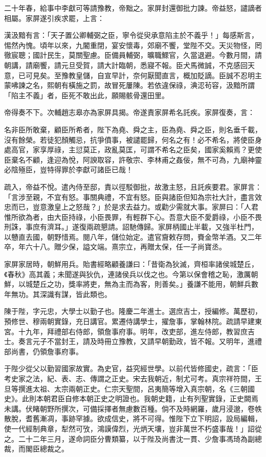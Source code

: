 \begin{pinyinscope}
二十年春，給事中李獻可等請豫教，帝黜之。家屏封還御批力諫。帝益怒，譴謫者相屬。家屏遂引疾求罷，上言：

漢汲黯有言：「天子置公卿輔弼之臣，寧令從臾承意陷主於不義乎！」每感斯言，惕然內愧。頃年以來，九閽重閉，宴安懷毒，郊廟不饗，堂陛不交。天災物怪，罔徹宸聰；國計民生，莫關聖慮。臣備員輔弼，曠職鰥官，久當退避。今數月間，請朝講，請廟饗，請元旦受賀，請大計臨朝，悉寢不報。臣犬馬微誠，不克感回天意，已可見矣。至豫教皇儲，自宣早計，奈何厭聞直言，概加貶謫。臣誠不忍明主蒙咈諫之名，熙朝有橫施之罰，故冒死屢陳。若依違保祿，淟涊茍容，汲黯所謂「陷主不義」者，臣死不敢出此，願賜骸骨還田里。

帝得奏不下。次輔趙志皋亦為家屏具揭。帝遂責家屏希名託疾。家屏復奏，言：

名非臣所敢棄，顧臣所希者，陛下為堯、舜之主，臣為堯、舜之臣，則名垂千載，沒有餘榮。若徒犯顏觸忌，抗爭僨事，被譴罷歸，何名之有！必不希名，將使臣身處高官，家享厚祿，主愆莫正，政亂莫匡，可謂不希名之臣矣，國家奚賴焉？更使臣棄名不顧，逢迎為悅，阿諛取容，許敬宗、李林甫之姦佞，無不可為，九廟神靈必陰殛臣，豈特得罪於李獻可諸臣已哉！

疏入，帝益不悅。遣內侍至邸，責以徑駁御批，故激主怒，且託疾要君。家屏言：「言涉至親，不宜有怒。事關典禮，不宜有怒。臣與諸臣但知為宗社大計，盡言效忠而已，豈意激皇上之怒哉？」於是求去益力。或勸少需就大事。家屏曰：「人君惟所欲為者，由大臣持祿，小臣畏罪，有輕群下心。吾意大臣不愛爵祿，小臣不畏刑誅，事庶有濟耳。」遂復兩疏懇請。詔馳傳歸。家屏柄國止半載，又強半杜門，以戇直去國，朝野惜焉。閱八年，儲位始定。遣官齎敕存問，賚金幣羊酒。又二年卒，年六十八。贈少保，謚文端。熹宗立，再贈太保，任一子尚寶丞。

家屏家居時，朝鮮用兵。貽書經略顧養謙曰：「昔衛為狄滅，齊桓率諸侯城楚丘，《春秋》高其義；未聞遂與狄仇，連諸侯兵以伐之也。今第以保會稽之恥，激厲朝鮮，以城楚丘之功，獎率將吏，無為主而為客，則善矣。」養謙不能用，朝鮮兵數年無功。其深識有謀，皆此類也。

陳于陛，字元忠，大學士以勤子也。隆慶二年進士。選庶吉士，授編修。萬歷初，預修世、穆兩朝實錄，充日講官。累遷侍講學士，擢詹事，掌翰林院。疏請早建東宮。十九年，拜禮部右侍郎，領詹事府事。明年，改吏部，進左侍郎，教習庶吉士。奏言元子不當封王，請及時冊立豫教，又請早朝勤政，皆不報。又明年，進禮部尚書，仍領詹事府事。

于陛少從父以勤習國家故實。為史官，益究經世學。以前代皆修國史，疏言：「臣考史家之法，紀、表、志、傳謂之正史。宋去我朝近，制尤可考。真宗祥符間，王旦等撰進太祖、太宗兩朝正史。仁宗天聖間，呂夷簡等增入真宗朝，名《三朝國史》。此則本朝君臣自修本朝正史之明證也。我朝史籍，止有列聖實錄，正史闕焉未講。伏睹朝野所撰次，可備採擇者無慮數百種。倘不及時網羅，歲月浸邈，卷帙散脫，耆舊漸凋，事跡罕據。欲成信史，將不可得。惟陛下立下明詔，設局編輯，使一代經制典章，犁然可攷，鴻謨偉烈，光炳天壤，豈非萬世不朽盛事哉！」詔從之。二十二年三月，遂命詞臣分曹類纂，以于陛及尚書沈一貫、少詹事馮琦為副總裁，而閣臣總裁之。


\end{pinyinscope}
